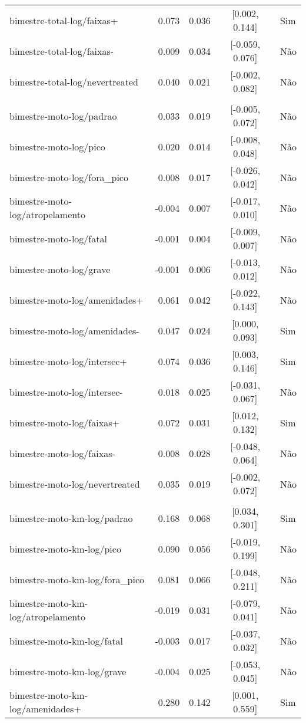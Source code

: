 \begin{longtable}{lrrcl}
bimestre-total-log/faixas+ & 0.073 & 0.036 & {}[0.002, 0.144] & Sim\\
bimestre-total-log/faixas- & 0.009 & 0.034 & {}[-0.059, 0.076] & Não\\
bimestre-total-log/nevertreated & 0.040 & 0.021 & {}[-0.002, 0.082] & Não\\
 &  &  &  & \\
bimestre-moto-log/padrao & 0.033 & 0.019 & {}[-0.005, 0.072] & Não\\
bimestre-moto-log/pico & 0.020 & 0.014 & {}[-0.008, 0.048] & Não\\
bimestre-moto-log/fora\_pico & 0.008 & 0.017 & {}[-0.026, 0.042] & Não\\
bimestre-moto-log/atropelamento & -0.004 & 0.007 & {}[-0.017, 0.010] & Não\\
bimestre-moto-log/fatal & -0.001 & 0.004 & {}[-0.009, 0.007] & Não\\
bimestre-moto-log/grave & -0.001 & 0.006 & {}[-0.013, 0.012] & Não\\
bimestre-moto-log/amenidades+ & 0.061 & 0.042 & {}[-0.022, 0.143] & Não\\
bimestre-moto-log/amenidades- & 0.047 & 0.024 & {}[0.000, 0.093] & Sim\\
bimestre-moto-log/intersec+ & 0.074 & 0.036 & {}[0.003, 0.146] & Sim\\
bimestre-moto-log/intersec- & 0.018 & 0.025 & {}[-0.031, 0.067] & Não\\
bimestre-moto-log/faixas+ & 0.072 & 0.031 & {}[0.012, 0.132] & Sim\\
bimestre-moto-log/faixas- & 0.008 & 0.028 & {}[-0.048, 0.064] & Não\\
bimestre-moto-log/nevertreated & 0.035 & 0.019 & {}[-0.002, 0.072] & Não\\
 &  &  &  & \\
bimestre-moto-km-log/padrao & 0.168 & 0.068 & {}[0.034, 0.301] & Sim\\
bimestre-moto-km-log/pico & 0.090 & 0.056 & {}[-0.019, 0.199] & Não\\
bimestre-moto-km-log/fora\_pico & 0.081 & 0.066 & {}[-0.048, 0.211] & Não\\
bimestre-moto-km-log/atropelamento & -0.019 & 0.031 & {}[-0.079, 0.041] & Não\\
bimestre-moto-km-log/fatal & -0.003 & 0.017 & {}[-0.037, 0.032] & Não\\
bimestre-moto-km-log/grave & -0.004 & 0.025 & {}[-0.053, 0.045] & Não\\
bimestre-moto-km-log/amenidades+ & 0.280 & 0.142 & {}[0.001, 0.559] & Sim\\

\end{longtable}
